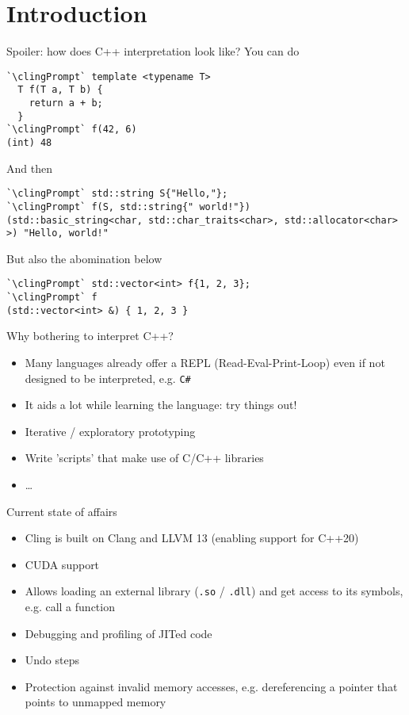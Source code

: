 \section{Introduction}

\begin{frame}[fragile]{Spoiler: how does C++ interpretation look like?}
  \def\clingPrompt{\textcolor{black!34}{[cling]\$ }}
  You can do
  \begin{lstlisting}[style=c++]
`\clingPrompt` template <typename T>
  T f(T a, T b) {
    return a + b;
  }
`\clingPrompt` f(42, 6)
(int) 48
  \end{lstlisting}

  \pause
  And then
  \begin{lstlisting}[style=c++]
`\clingPrompt` std::string S{"Hello,"};
`\clingPrompt` f(S, std::string{" world!"})
(std::basic_string<char, std::char_traits<char>, std::allocator<char> >) "Hello, world!"
  \end{lstlisting}

  \pause
  But also the abomination below
  \begin{lstlisting}[style=c++]
`\clingPrompt` std::vector<int> f{1, 2, 3};
`\clingPrompt` f
(std::vector<int> &) { 1, 2, 3 }
  \end{lstlisting}
\end{frame}

\begin{frame}{Why bothering to interpret C++?}
  \begin{itemize}
  \item Many languages already offer a REPL (Read-Eval-Print-Loop) even if not designed to be interpreted, e.g. \texttt{C\#}
  \item It aids a lot while learning the language: try things out!
  \item Iterative / exploratory prototyping
  \item Write 'scripts' that make use of C/C++ libraries

  \item \ldots{}
  \end{itemize}
\end{frame}

\begin{frame}{Current state of affairs}
  \begin{itemize}
    \itemsep=1ex

  \item Cling is built on Clang and LLVM 13 (enabling support for C++20)
  \item CUDA support
  \item Allows loading an external library (\texttt{.so} / \texttt{.dll}) and get access to its symbols, e.g. call a function
  \item Debugging and profiling of JITed code
  \item Undo steps
  \item Protection against invalid memory accesses, e.g. dereferencing a pointer that points to unmapped memory
  \end{itemize}
\end{frame}

